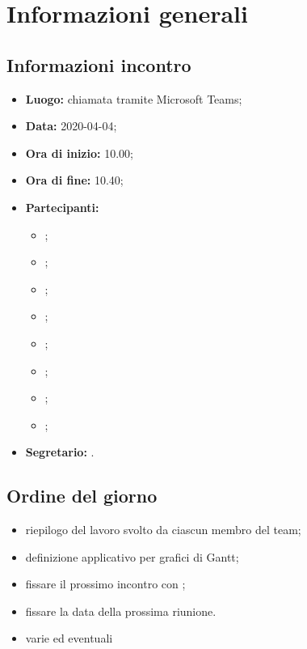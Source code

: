 \section{Informazioni generali}
\subsection{Informazioni incontro}
\begin{itemize}
	\item \textbf{Luogo:} chiamata tramite Microsoft Teams; 
	\item \textbf{Data:} 2020-04-04;
	\item \textbf{Ora di inizio:} 10.00; 
	\item \textbf{Ora di fine:} 10.40; 
	\item \textbf{Partecipanti:}
		\begin{itemize}
			\item \VB; 
			\item \LB; 
			\item \NF; 
			\item \EG; 
			\item \FJ; 
			\item \MP; 
			\item \AS; 
			\item \AZ; 
		\end{itemize}
	\item \textbf{Segretario:} \LB. 
\end{itemize}

\subsection{Ordine del giorno}
\begin{itemize}
	\item riepilogo del lavoro svolto da ciascun membro del team;
	\item definizione applicativo per grafici di Gantt;
	\item fissare il prossimo incontro con \Proponente{};
	\item fissare la data della prossima riunione.
	\item varie ed eventuali
\end{itemize}
